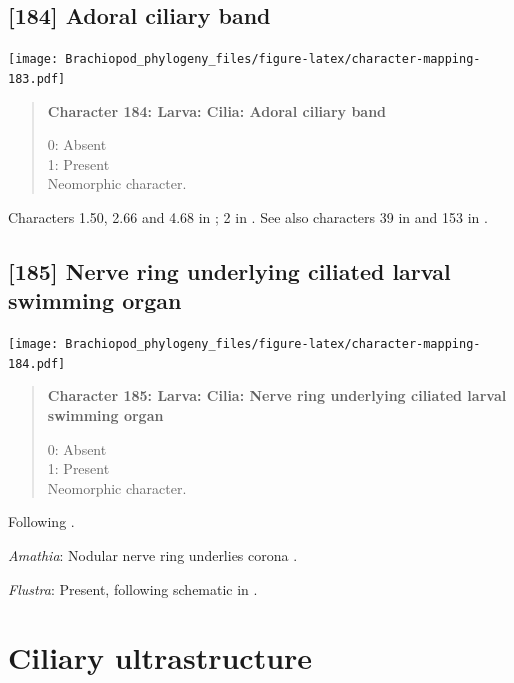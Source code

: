 \documentclass[openany]{book}
\begin{document}
\subsection*{{[}184{]} Adoral ciliary band}\label{adoral-ciliary-band}

\texttt{[image: Brachiopod\_phylogeny\_files/figure-latex/character-mapping-183.pdf]}

\begin{quote}
\textbf{Character 184: Larva: Cilia: Adoral ciliary band}

0: Absent\\
1: Present\\
Neomorphic character.
\end{quote}

Characters 1.50, 2.66 and 4.68 in \citet{SPS1996}; 2 in
\citet{Vinther2008}. See also characters 39 in \citet{Haszprunar1996}
and 153 in \citet{Giribet2002}.

\subsection*{{[}185{]} Nerve ring underlying ciliated larval swimming
organ}\label{nerve-ring-underlying-ciliated-larval-swimming-organ}

\texttt{[image: Brachiopod\_phylogeny\_files/figure-latex/character-mapping-184.pdf]}

\begin{quote}
\textbf{Character 185: Larva: Cilia: Nerve ring underlying ciliated
larval swimming organ}

0: Absent\\
1: Present\\
Neomorphic character.
\end{quote}

Following \citet{Wanninger2009}.

\hypertarget{Amathia-coding-185}{}
\emph{Amathia}: Nodular nerve ring underlies corona \citep{Reed1982}.

\hypertarget{Flustra-coding-185}{}
\emph{Flustra}: Present, following schematic in \citet{Gruhl2016}.

\section{Ciliary ultrastructure}\label{ciliary-ultrastructure}
\end{document}
